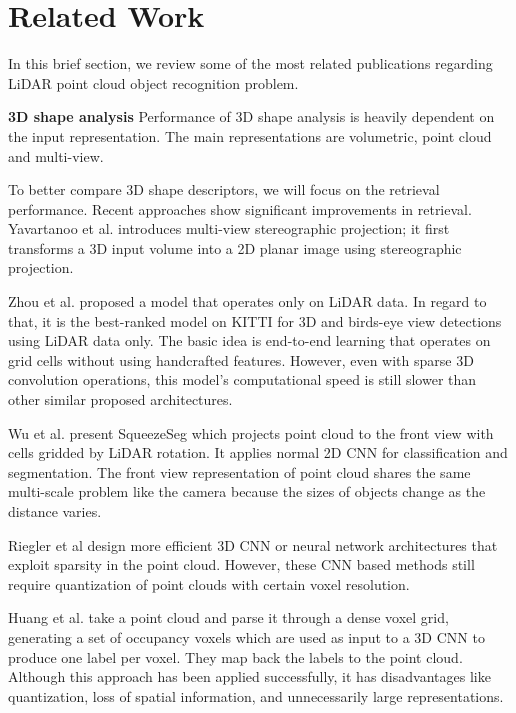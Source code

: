 \section{Related Work}\label{sec:relatedWork}
In this brief section, we review some of the most related publications regarding LiDAR point cloud object recognition problem.

\textbf{3D shape analysis} Performance of 3D shape analysis is heavily dependent on the input representation. 
The main representations are volumetric, point cloud and multi-view.

To better compare 3D shape descriptors, we will focus on the retrieval performance. Recent
approaches show significant improvements in retrieval. Yavartanoo et al. \cite{DBLP:journals/corr/abs-1811-01571} 
introduces multi-view stereographic projection; it first transforms a 3D input volume into a 2D planar image using stereographic projection.

Zhou et al. \cite{Zhou_2018_CVPR} proposed a model that operates only on LiDAR data. 
In regard to that, it is the best-ranked model on KITTI \cite{geiger2012we} for 3D and birds-eye view detections using LiDAR data only. 
The basic idea is end-to-end learning that operates on grid cells without using handcrafted features. However, even with sparse 3D convolution 
operations, this model's computational speed is still slower than other similar proposed architectures.


Wu et al. \cite{DBLP:conf/icra/WuWYK18} present SqueezeSeg which projects point cloud to the front view with cells gridded by LiDAR rotation. 
It applies normal 2D CNN for classification and segmentation. The front view representation of point cloud shares 
the same multi-scale problem like the camera because the sizes of objects change as the distance varies.

Riegler et al \cite{DBLP:conf/cvpr/RieglerUG17} design more efficient 3D CNN or neural network architectures that exploit sparsity in the point cloud. 
However, these CNN based methods still require quantization of point clouds with certain voxel resolution.

Huang et al. \cite{DBLP:conf/icpr/HuangY16} take a point cloud and parse it through a dense voxel grid, generating a set of occupancy voxels 
which are used as input to a 3D CNN to produce one label per voxel. They map back the labels to the point cloud. Although this approach has 
been applied successfully, it has disadvantages like quantization, loss of spatial information, and unnecessarily large representations.

